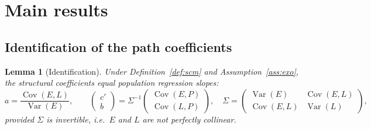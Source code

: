 \documentclass{amsart}
\newtheorem{lemma}{Lemma}
\theoremstyle{definition}
\begin{document}
\section{Main results}

\subsection{Identification of the path coefficients}

\begin{lemma}[Identification]\label{lem:ident}
Under Definition~\ref{def:scm} and Assumption~\ref{ass:exo}, the structural
coefficients equal population regression slopes:
\[
a=\frac{\operatorname{Cov}(E,L)}{\operatorname{Var}(E)},\qquad
\begin{pmatrix} c'\\ b\end{pmatrix}
=\Sigma^{-1}
\begin{pmatrix}\operatorname{Cov}(E,P)\\ \operatorname{Cov}(L,P)\end{pmatrix},
\quad
\Sigma=\begin{pmatrix}\operatorname{Var}(E)&\operatorname{Cov}(E,L)\\
\operatorname{Cov}(E,L)&\operatorname{Var}(L)\end{pmatrix},
\]
provided $\Sigma$ is invertible, i.e.\ $E$ and $L$ are not perfectly
collinear.
\end{lemma}
\end{document}
